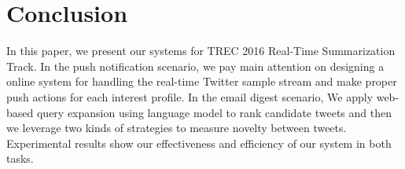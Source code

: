 \section{Conclusion}
In this paper, we present our systems for TREC 2016 Real-Time Summarization Track.
In the push notification scenario,
we pay main attention on designing a online system
for handling the real-time Twitter sample stream
and make proper push actions for each interest profile.
In the email digest scenario,
We apply web-based query expansion using language model to rank candidate tweets and
then we leverage two kinds of strategies to measure novelty between tweets.
Experimental results show our effectiveness and efficiency of our system in both tasks.



